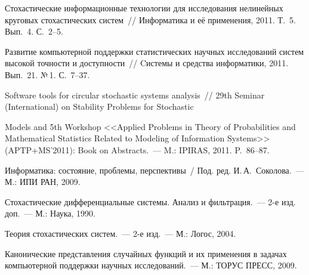 \begin{multicols}{2}
{{\begin{thebibliography}{9}
Стохастические информационные технологии для исследования 
нелинейных круговых стохастических систем~// Информатика и её применения, 2011. Т.~5. Вып.~4. 
С.~2--5.

Развитие компьютерной поддержки статистических научных исследований сис\-тем 
высокой точности и доступности~// Cистемы и средства информатики, 2011. Вып.~21. №\,1. С.~7--37.

Software tools for circular stochastic systems analysis~// 29th
Seminar (International) on Stability Problems for Stochastic\linebreak\vspace*{-12pt}
\pagebreak

\noindent
 Models
and 5th Workshop <<Applied Problems in Theory of Probabilities and
Mathematical Statistics Related to Modeling of Information Systems>>
(APTP\;+\;MS'2011): Book on Abstracts.~--- M.: IPIRAS, 2011. P.~86--87.

Информатика: состояние, проблемы, перспективы~/ Под. ред. И.\,А.~Соколова.~--- М.: ИПИ
РАН, 2009.

Стохастические дифференциальные системы. Анализ и фильтрация.~--- 2-е изд. доп.~--- М.: Наука, 1990.

Теория стохастических систем.~--- 2-е изд.~--- М.: Логос, 2004.

\label{end\stat}

Канонические представления случайных функций и их применения 
в задачах компьютерной поддержки научных исследований.~--- М.: ТОРУС ПРЕСС, 2009.
 \end{thebibliography}
}
}


\end{multicols}       